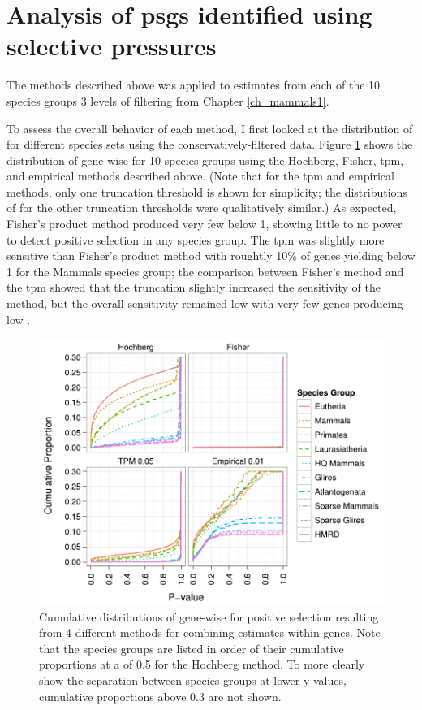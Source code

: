 \section{Analysis of \acp{psg} identified using \sw selective pressures}

The methods described above was applied to \sw estimates from each of
the 10 species groups 3 levels of \sw filtering from Chapter
\ref{ch_mammals1}.

To assess the overall behavior of each method, I first looked at the
distribution of \pvs for different species sets using the
conservatively-filtered \sw data. Figure \ref{fig_psg_pvals} shows the
distribution of gene-wise \pvs for 10 species groups using the
Hochberg, Fisher, \ac{tpm}, and empirical methods described
above. (Note that for the \ac{tpm} and empirical methods, only one
truncation threshold is shown for simplicity; the distributions of
\pvs for the other truncation thresholds were qualitatively
similar.) As expected, Fisher's product method produced very few
\pvs below 1, showing little to no power to detect positive
selection in any species group. The \ac{tpm} was slightly more
sensitive than Fisher's product method with roughtly 10\% of genes
yielding \pvs below 1 for the Mammals species group; the
comparison between Fisher's method and the \ac{tpm} showed that the
truncation slightly increased the sensitivity of the method, but the
overall sensitivity remained low with very few genes producing low
\pvs.

\begin{figure}
\centering
\includegraphics[scale=0.9]{Figs/psg_pvals.pdf}
\caption{Cumulative distributions of gene-wise \pvs for positive
  selection resulting from 4 different methods for combining \sw
  estimates within genes. Note that the species groups are listed in
  order of their cumulative proportions at a \pv of 0.5 for the
  Hochberg method. To more clearly show the separation between species
  groups at lower y-values, cumulative proportions above 0.3 are not
  shown.}
\label{fig_psg_pvals}
\end{figure}

